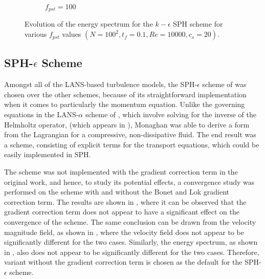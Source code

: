 \begin{figure}[htbp!]
\begin{subfigure}{7cm}
    \caption{$f_{pst} = 100$}
  \end{subfigure}
  \caption{Evolution of the energy spectrum for the $k-\epsilon$ SPH scheme for various $f_{pst}$ values $(N=100^2, t_f=0.1, Re=10000, c_s=20)$.}
  \label{fig:keps-pst-espec}
\end{figure}



\subsection[SPH-epsilon Scheme]{SPH-$\epsilon$ Scheme}
Amongst all of the LANS-based turbulence models, the SPH-$\epsilon$ scheme of \cite{Monaghan2017} was chosen over the other schemes, because of its straightforward implementation when it comes to particularly the momentum equation. Unlike the governing equations in the LANS-$\alpha$ scheme of \cite{Mohseni2003}, which involve solving for the inverse of the Helmholtz operator, (which appears in ), Monaghan was able to derive a form from the Lagrangian for a compressive, non-dissipative fluid. The end result was a scheme, consisting of explicit terms for the transport equations, which could be easily implemented in SPH.

The scheme was not implemented with the gradient correction term in the original work, and hence, to study its potential effects, a convergence study was performed on the scheme with and without the Bonet and Lok gradient correction term.
The results are shown in , where it can be observed that the gradient correction term does not appear to have a significant effect on the convergence of the scheme.
The same conclusion can be drawn from the velocity magnitude field, as shown in , where the velocity field does not appear to be significantly different for the two cases.
Similarly, the energy spectrum, as shown in , also does not appear to be significantly different for the two cases. Therefore, variant without the gradient correction term is chosen as the default for the SPH-$\epsilon$ scheme.

